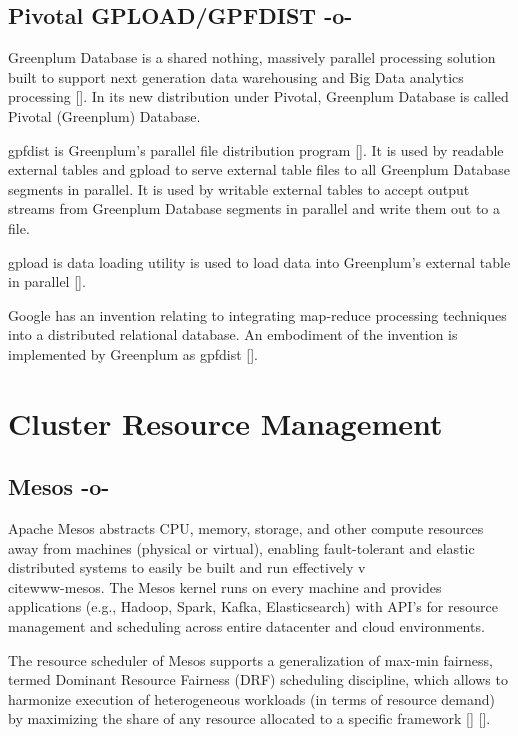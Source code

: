\subsection{Pivotal GPLOAD/GPFDIST -o-}

Greenplum Database is a shared nothing, massively parallel processing
solution built to support next generation data warehousing and Big
Data analytics processing [\cite{book-greenplum-gollapudi2013}]. In its
new distribution under Pivotal, Greenplum Database is called Pivotal
(Greenplum) Database.

gpfdist is Greenplum's parallel file distribution
program [\cite{www-gpfdist}]. It is used by readable external tables and
gpload to serve external table files to all Greenplum Database
segments in parallel. It is used by writable external tables to accept
output streams from Greenplum Database segments in parallel and write
them out to a file.

gpload is data loading utility is used to load data into Greenplum's
external table in parallel [\cite{book-greenplum-gollapudi2013}].

Google has an invention relating to integrating map-reduce processing
techniques into a distributed relational database. An embodiment of
the invention is implemented by Greenplum as
gpfdist [\cite{patent-google-gpf}].



\section{Cluster Resource Management}


\subsection{Mesos -o-}

Apache Mesos abstracts CPU, memory, storage, and other compute
resources away from machines (physical or virtual), enabling
fault-tolerant and elastic distributed systems to easily be built and
run effectively v\\cite{www-mesos}.  The Mesos kernel runs on every
machine and provides applications (e.g., Hadoop, Spark, Kafka,
Elasticsearch) with API's for resource management and scheduling
across entire datacenter and cloud environments.

The resource scheduler of Mesos supports a generalization of max-min
fairness, termed Dominant Resource Fairness (DRF) scheduling
discipline, which allows to harmonize execution of heterogeneous
workloads (in terms of resource demand) by maximizing the share of any
resource allocated to a specific framework
[\cite{paper-mesos-Abu-Dbai-2016}]
[\cite{paper-mesos-ghodsi2011dominant}].
     
